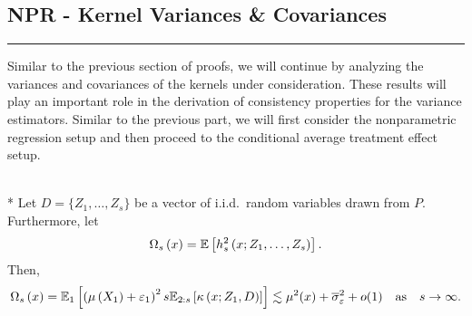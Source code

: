\subsection{NPR - Kernel Variances \& Covariances}
\hrule
Similar to the previous section of proofs, we will continue by analyzing the variances and covariances of the kernels under consideration.
These results will play an important role in the derivation of consistency properties for the variance estimators.
Similar to the previous part, we will first consider the nonparametric regression setup and then proceed to the conditional average treatment effect setup.

\begin{boxD}
    \begin{lem}\label{lem:omega_s}\mbox{}\\*
	Let $D = \{Z_1, \dotsc, Z_{s}\}$ be a vector of i.i.d.\ random variables drawn from $P$.
	Furthermore, let
	\begin{equation}
		\Omega_{s}\left(x\right)
		= \mathbb{E}\left[h_{s}^{2}\left(x; Z_1, \ldots,  Z_{s}\right)\right].
	\end{equation}
	Then,
	\begin{equation}
		\Omega_{s}\left(x\right)
		= \mathbb{E}_{1}\left[\left(\mu\left(X_1\right)+ \varepsilon_1\right)^2 s \mathbb{E}_{2:s}\left[\kappa\left(x; Z_1, D\right)\right]\right]
		\lesssim \mu^2(x) + \overline{\sigma}_{\varepsilon}^2 + o(1)
		\quad \text{as} \quad s \rightarrow \infty.
	\end{equation}
\end{lem}
\end{boxD}

